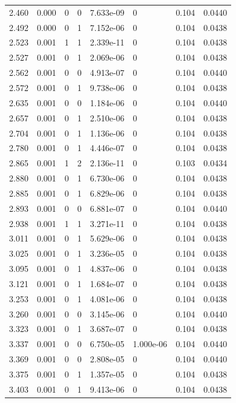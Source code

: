 \documentclass[preview]{standalone}
\begin{document}
{{{\begin{tabular}{L{1.2cm}C{1.2cm} C{0.3cm}C{0.5cm} C{1.4cm}C{1.4cm} C{1.4cm}C{1.4cm}}
  2.460  &  0.000  & 0     &  0 &  7.633e-09  & 0  & 0.104 &  0.0440   \\ 
  2.492  &  0.000  & 0     &  1 &  7.152e-06  & 0  & 0.104 &  0.0438   \\ 
  2.523  &  0.001  & 1     &  1 &  2.339e-11  & 0  & 0.104 &  0.0438   \\ 
  2.527  &  0.001  & 0     &  1 &  2.069e-06  & 0  & 0.104 &  0.0438   \\ 
  2.562  &  0.001  & 0     &  0 &  4.913e-07  & 0  & 0.104 &  0.0440   \\ 
  2.572  &  0.001  & 0     &  1 &  9.738e-06  & 0  & 0.104 &  0.0438   \\ 
  2.635  &  0.001  & 0     &  0 &  1.184e-06  & 0  & 0.104 &  0.0440   \\ 
  2.657  &  0.001  & 0     &  1 &  2.510e-06  & 0  & 0.104 &  0.0438   \\ 
  2.704  &  0.001  & 0     &  1 &  1.136e-06  & 0  & 0.104 &  0.0438   \\ 
  2.780  &  0.001  & 0     &  1 &  4.446e-07  & 0  & 0.104 &  0.0438   \\ 
  2.865  &  0.001  & 1     &  2 &  2.136e-11  & 0  & 0.103 &  0.0434   \\ 
  2.880  &  0.001  & 0     &  1 &  6.730e-06  & 0  & 0.104 &  0.0438   \\ 
  2.885  &  0.001  & 0     &  1 &  6.829e-06  & 0  & 0.104 &  0.0438   \\ 
  2.893  &  0.001  & 0     &  0 &  6.881e-07  & 0  & 0.104 &  0.0440   \\ 
  2.938  &  0.001  & 1     &  1 &  3.271e-11  & 0  & 0.104 &  0.0438   \\ 
  3.011  &  0.001  & 0     &  1 &  5.629e-06  & 0  & 0.104 &  0.0438   \\ 
  3.025  &  0.001  & 0     &  1 &  3.236e-05  & 0  & 0.104 &  0.0438   \\ 
  3.095  &  0.001  & 0     &  1 &  4.837e-06  & 0  & 0.104 &  0.0438   \\ 
  3.121  &  0.001  & 0     &  1 &  1.684e-07  & 0  & 0.104 &  0.0438   \\ 
  3.253  &  0.001  & 0     &  1 &  4.081e-06  & 0  & 0.104 &  0.0438   \\ 
  3.260  &  0.001  & 0     &  0 &  3.145e-06  & 0  & 0.104 &  0.0440   \\ 
  3.323  &  0.001  & 0     &  1 &  3.687e-07  & 0  & 0.104 &  0.0438   \\ 
  3.337  &  0.001  & 0     &  0 &  6.750e-05  & 1.000e-06  & 0.104 &  0.0440   \\ 
  3.369  &  0.001  & 0     &  0 &  2.808e-05  & 0  & 0.104 &  0.0440   \\ 
  3.375  &  0.001  & 0     &  1 &  1.357e-05  & 0  & 0.104 &  0.0438   \\ 
  3.403  &  0.001  & 0     &  1 &  9.413e-06  & 0  & 0.104 &  0.0438   \\ 
\hline 
\end{tabular} 

}}}
\end{document}
